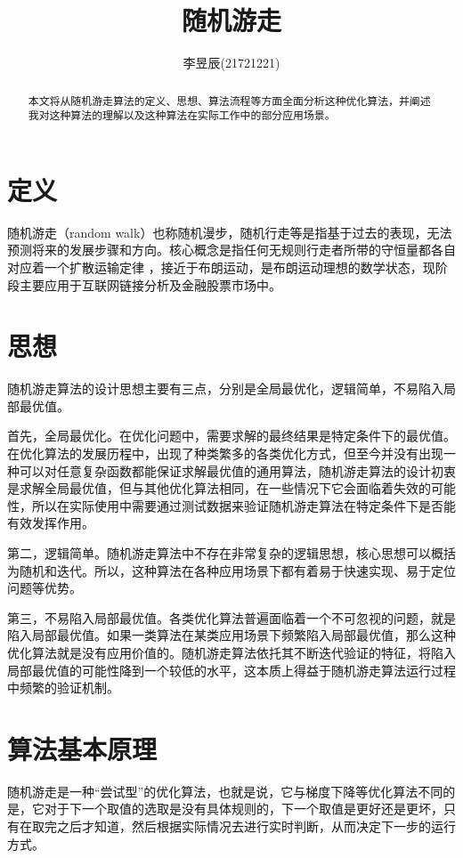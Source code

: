 \documentclass{ctexart}
\title{随机游走}
\author{李昱辰(21721221)}
\begin{document}
\maketitle

\begin{abstract}
本文将从随机游走算法的定义、思想、算法流程等方面全面分析这种优化算法，并阐述我对这种算法的理解以及这种算法在实际工作中的部分应用场景。
\end{abstract}

\section{定义}
随机游走（random walk）也称随机漫步，随机行走等是指基于过去的表现，无法预测将来的发展步骤和方向。核心概念是指任何无规则行走者所带的守恒量都各自对应着一个扩散运输定律 ，接近于布朗运动，是布朗运动理想的数学状态，现阶段主要应用于互联网链接分析及金融股票市场中。

\section{思想}
随机游走算法的设计思想主要有三点，分别是全局最优化，逻辑简单，不易陷入局部最优值。

首先，全局最优化。在优化问题中，需要求解的最终结果是特定条件下的最优值。在优化算法的发展历程中，出现了种类繁多的各类优化方式，但至今并没有出现一种可以对任意复杂函数都能保证求解最优值的通用算法，随机游走算法的设计初衷是求解全局最优值，但与其他优化算法相同，在一些情况下它会面临着失效的可能性，所以在实际使用中需要通过测试数据来验证随机游走算法在特定条件下是否能有效发挥作用。

第二，逻辑简单。随机游走算法中不存在非常复杂的逻辑思想，核心思想可以概括为随机和迭代。所以，这种算法在各种应用场景下都有着易于快速实现、易于定位问题等优势。

第三，不易陷入局部最优值。各类优化算法普遍面临着一个不可忽视的问题，就是陷入局部最优值。如果一类算法在某类应用场景下频繁陷入局部最优值，那么这种优化算法就是没有应用价值的。随机游走算法依托其不断迭代验证的特征，将陷入局部最优值的可能性降到一个较低的水平，这本质上得益于随机游走算法运行过程中频繁的验证机制。

\section{算法基本原理}
随机游走是一种“尝试型”的优化算法，也就是说，它与梯度下降等优化算法不同的是，它对于下一个取值的选取是没有具体规则的，下一个取值是更好还是更坏，只有在取完之后才知道，然后根据实际情况去进行实时判断，从而决定下一步的运行方式。
\end{document}
